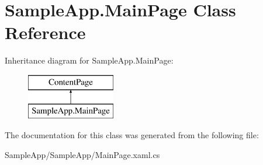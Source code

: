 \hypertarget{class_sample_app_1_1_main_page}{}\section{Sample\+App.\+Main\+Page Class Reference}
\label{class_sample_app_1_1_main_page}
Inheritance diagram for Sample\+App.\+Main\+Page\+:\begin{figure}[H]
\begin{center}
\leavevmode
\includegraphics[height=2.000000cm]{class_sample_app_1_1_main_page}
\end{center}
\end{figure}


The documentation for this class was generated from the following file\+:\begin{DoxyCompactItemize}
\item 
Sample\+App/\+Sample\+App/Main\+Page.\+xaml.\+cs\end{DoxyCompactItemize}
